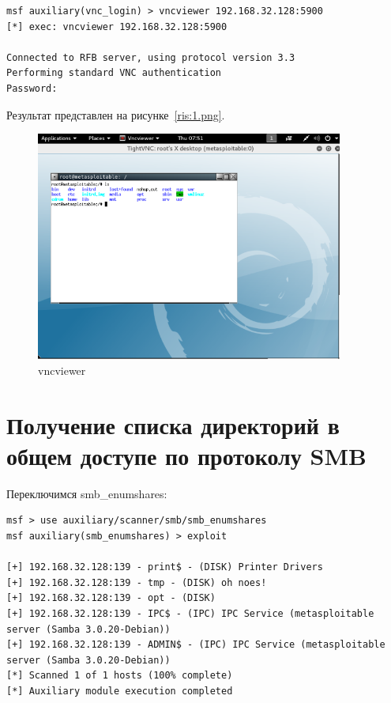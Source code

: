 \documentclass[10pt,a4paper]{report}
\begin{document}
		\begin{lstlisting}
msf auxiliary(vnc_login) > vncviewer 192.168.32.128:5900
[*] exec: vncviewer 192.168.32.128:5900

Connected to RFB server, using protocol version 3.3
Performing standard VNC authentication
Password: 
		\end{lstlisting}
		Результат представлен на рисунке~\ref{ris:1.png}.
		
		\begin{figure}[h]
			\centering
			\includegraphics[width=0.9\textwidth]{pic1.png}
			\caption{vncviewer}
			\label{ris:vncviewerLogin}
		\end{figure}
		
	\section{Получение списка директорий в общем доступе по протоколу SMB}
		Переключимся  smb\_enumshares:
		
		\begin{lstlisting}
msf > use auxiliary/scanner/smb/smb_enumshares 
msf auxiliary(smb_enumshares) > exploit

[+] 192.168.32.128:139 - print$ - (DISK) Printer Drivers
[+] 192.168.32.128:139 - tmp - (DISK) oh noes!
[+] 192.168.32.128:139 - opt - (DISK) 
[+] 192.168.32.128:139 - IPC$ - (IPC) IPC Service (metasploitable server (Samba 3.0.20-Debian))
[+] 192.168.32.128:139 - ADMIN$ - (IPC) IPC Service (metasploitable server (Samba 3.0.20-Debian))
[*] Scanned 1 of 1 hosts (100% complete)
[*] Auxiliary module execution completed

		\end{lstlisting}
		
\end{document}
